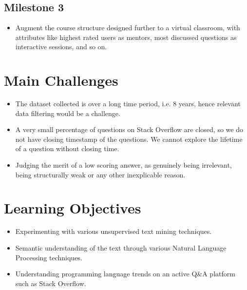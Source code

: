 \documentclass{article}
\begin{document}
\subsection{Milestone 3}
\begin{itemize}
\item Augment the course structure designed further to a virtual classroom, with attributes like highest rated users as mentors, most discussed questions as interactive sessions, and so on.

\end{itemize}



\newpage
\section{Main Challenges}
\begin{itemize}
\item The dataset collected is over a long time period, i.e. 8 years, hence relevant data filtering would be a challenge.
\item A very small percentage of questions on Stack Overflow are closed, so we do not have closing timestamp of the questions. We cannot explore the lifetime of a question without closing time.
\item Judging the merit of a low scoring answer, as genuinely being irrelevant,  being structurally weak or any other inexplicable reason.
\end{itemize} 

\bigskip
\section{Learning Objectives}
\begin{itemize}
\item Experimenting with various unsupervised text mining techniques.
\item Semantic understanding of the text through various Natural Language Processing techniques.
\item Understanding  programming language trends on an active Q\&A platform such as Stack Overflow.
\end{itemize}
\end{document}
